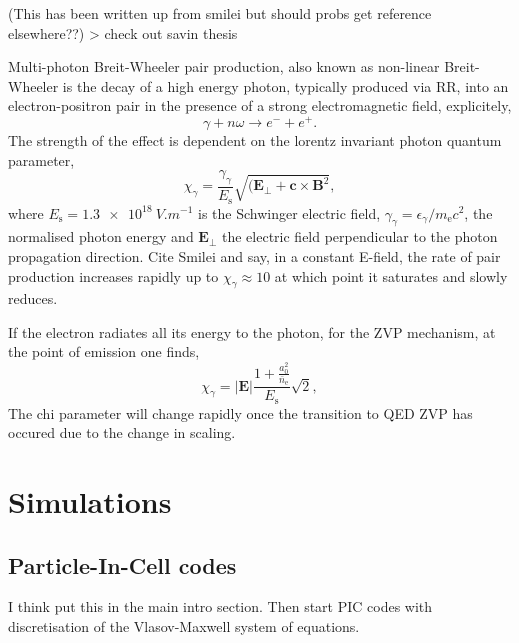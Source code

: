 (This has been written up from smilei but should probs get reference elsewhere??) > check out savin thesis

Multi-photon Breit-Wheeler pair production, also known as non-linear Breit-Wheeler is the decay of a high energy photon, typically produced via \ac{RR}, into an electron-positron pair in the presence of a strong electromagnetic field, explicitely,
\begin{equation}
	\gamma + n\omega \to e^- + e^+.
\end{equation}
The strength of the effect is dependent on the lorentz invariant photon quantum parameter,
\begin{equation}
	\chi_\gamma = \frac{\gamma_\gamma}{E_\mathrm{s}} \sqrt{(\mathbf{E}_\perp + \mathbf{c}\times \mathbf{B}^2},
\end{equation}
where $E_\mathrm{s} = \qty{1.3e18}{V.m^{-1}}$ is the Schwinger electric field, $\gamma_\gamma = \epsilon_\gamma /m_\mathrm{e}c^2$, the normalised photon energy and $\mathbf{E}_\perp$ the electric field perpendicular to the photon propagation direction. Cite Smilei and say, in a constant E-field, the rate of pair production increases rapidly up to $\chi_\gamma \approx 10$ at which point it saturates and slowly reduces.


If the electron radiates all its energy to the photon, for the ZVP mechanism, at the point of emission one finds,
\begin{equation}
	\chi_\gamma = |\mathbf{E}|\frac{1 + \frac{a^2_0}{\bar{n}_\mathrm{e}}}{E_\mathrm{s}} \sqrt{2},
\end{equation}
The chi parameter will change rapidly once the transition to QED ZVP has occured due to the change in scaling.


\section{Simulations}
\subsection{Particle-In-Cell codes}

I think put this in the main intro section. Then start PIC codes with discretisation of the Vlasov-Maxwell system of equations.

